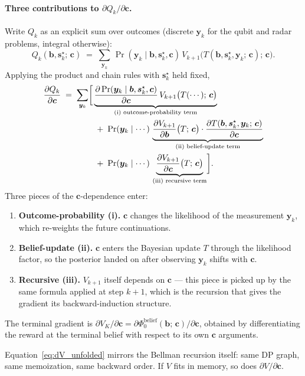 \documentclass[11pt]{article}
\newcommand{\bc}{\bm{c}}
\newcommand{\by}{\bm{y}}
\newcommand{\bs}{\bm{s}}
\newcommand{\bb}{\bm{b}}
\begin{document}
\paragraph{Three contributions to $\partial Q_k / \partial \bc$.}  Write $Q_k$ as an explicit sum over outcomes (discrete $\by_k$ for the qubit and radar problems, integral otherwise):
\begin{equation}
Q_k(\bb, \bs_k^\star;\, \bc) \;=\; \sum_{\by_k}\, \Pr(\by_k \mid \bb, \bs_k^\star, \bc)\, V_{k+1}\bigl(T(\bb, \bs_k^\star, \by_k;\, \bc);\, \bc\bigr).
\end{equation}
Applying the product and chain rules with $\bs_k^\star$ held fixed,
\begin{align}
\frac{\partial Q_k}{\partial \bc} \;=\; \sum_{\by_k} \biggl[ &\underbrace{\frac{\partial \Pr(\by_k \mid \bb, \bs_k^\star, \bc)}{\partial \bc}\, V_{k+1}\bigl(T(\cdots);\, \bc\bigr)}_{\text{(i) outcome-probability term}} \notag \\
&\; +\; \Pr(\by_k \mid \cdots)\, \underbrace{\frac{\partial V_{k+1}}{\partial \bb}\bigl(T;\, \bc\bigr) \cdot \frac{\partial T(\bb, \bs_k^\star, \by_k;\, \bc)}{\partial \bc}}_{\text{(ii) belief-update term}} \notag \\
&\; +\; \Pr(\by_k \mid \cdots)\, \underbrace{\frac{\partial V_{k+1}}{\partial \bc}\bigl(T;\, \bc\bigr)}_{\text{(iii) recursive term}} \biggr].
\label{eq:dV_unfolded}
\end{align}
Three pieces of the $\bc$-dependence enter:
\begin{enumerate}[nosep, leftmargin=*]
\item \textbf{Outcome-probability (i).}  $\bc$ changes the likelihood of the measurement $\by_k$, which re-weights the future continuations.
\item \textbf{Belief-update (ii).}  $\bc$ enters the Bayesian update $T$ through the likelihood factor, so the posterior landed on after observing $\by_k$ shifts with $\bc$.
\item \textbf{Recursive (iii).}  $V_{k+1}$ itself depends on $\bc$ --- this piece is picked up by the same formula applied at step $k+1$, which is the recursion that gives the gradient its backward-induction structure.
\end{enumerate}
The terminal gradient is $\partial V_K / \partial \bc = \partial \Phi_0^{\mathrm{belief}}(\bb;\, \bc) / \partial \bc$, obtained by differentiating the reward at the terminal belief with respect to its own $\bc$ arguments.

Equation~\eqref{eq:dV_unfolded} mirrors the Bellman recursion itself: same DP graph, same memoization, same backward order.  If $V$ fits in memory, so does $\partial V / \partial \bc$.
\end{document}
